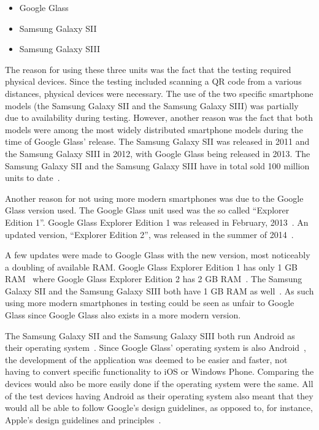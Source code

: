 \begin{itemize}
	\item Google Glass
	\item Samsung Galaxy SII
	\item Samsung Galaxy SIII
\end{itemize}

The reason for using these three units was the fact that the testing required physical devices. Since the testing included scanning a QR code from a various distances, physical devices were necessary. The use of the two specific smartphone models (the Samsung Galaxy SII and the Samsung Galaxy SIII) was partially due to availability during testing. However, another reason was the fact that both models were among the most widely distributed smartphone models during the time of Google Glass' release. The Samsung Galaxy SII was released in 2011 and the Samsung Galaxy SIII in 2012, with Google Glass being released in 2013. The Samsung Galaxy SII and the Samsung Galaxy SIII have in total sold 100 million units to date~\cite{samsungGalaxyS2Sales, samsungGalaxyS3Sales}.

Another reason for not using more modern smartphones was due to the Google Glass version used. The Google Glass unit used was the so called ``Explorer Edition 1''. Google Glass Explorer Edition 1 was released in February, 2013~\cite{historyOfGlass}. An updated version, ``Explorer Edition 2'', was released in the summer of 2014~\cite{googleGlassEdition2RAM}. 

A few updates were made to Google Glass with the new version, most noticeably a doubling of available RAM. Google Glass Explorer Edition 1 has only 1 GB RAM~\cite{googleGlassEdition1RAM} where Google Glass Explorer Edition 2 has 2 GB RAM~\cite{googleGlassEdition2RAM}. The Samsung Galaxy SII and the Samsung Galaxy SIII both have 1 GB RAM as well~\cite{samsungGalaxyS2Wiki, samsungGalaxyS3Wiki}. As such using more modern smartphones in testing could be seen as unfair to Google Glass since Google Glass also exists in a more modern version.

The Samsung Galaxy SII and the Samsung Galaxy SIII both run Android as their operating system~\cite{samsungGalaxyS2Wiki, samsungGalaxyS3Wiki}. Since Google Glass' operating system is also Android~\cite{googleGlassWiki}, the development of the application was deemed to be easier and faster, not having to convert specific functionality to iOS or Windows Phone. Comparing the devices would also be more easily done if the operating system were the same. All of the test devices having Android as their operating system also meant that they would all be able to follow Google's design guidelines, as opposed to, for instance, Apple's design guidelines and principles~\cite{iosDesignGuidelines}.

